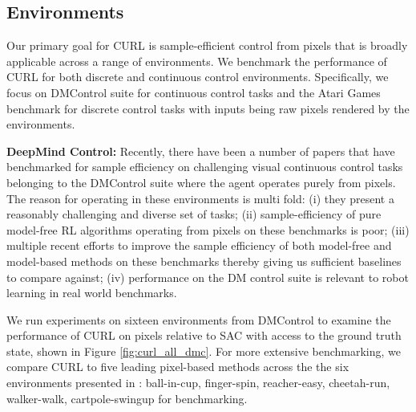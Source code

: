 \begin{table}[h!]
\begin{center}
\begin{small}
\begin{sc}
\begin{tabular}{lccccccc}
\bottomrule
\end{tabular}
\end{sc}
\end{small}
\end{center}
\vskip -0.1in
\end{table}


\subsection{Environments}

Our primary goal for CURL is sample-efficient control from pixels that is broadly applicable across a range of environments. We benchmark the performance of CURL for both discrete and continuous control environments. Specifically, we focus on DMControl suite for continuous control tasks and the Atari Games benchmark for discrete control tasks with inputs being raw pixels rendered by the environments.

\textbf{DeepMind Control:} Recently, there have been a number of papers that have benchmarked for sample efficiency on challenging visual continuous control tasks belonging to the DMControl suite \cite{tassa2018deepmind} where the agent operates purely from pixels. The reason for operating in these environments is multi fold: (i) they present a reasonably challenging and diverse set of tasks; (ii) sample-efficiency of pure model-free RL algorithms operating from pixels on these benchmarks is poor; (iii) multiple recent efforts to improve the sample efficiency of both model-free and model-based methods on these benchmarks thereby giving us sufficient baselines to compare against; (iv) performance on the DM control suite is relevant to robot learning in real world benchmarks.

We run experiments on sixteen environments from DMControl to examine the performance of CURL on pixels relative to SAC with access to the ground truth state, shown in Figure \ref{fig:curl_all_dmc}. For more extensive benchmarking, we compare CURL to five leading pixel-based methods across the the six environments presented in \citet{yarats2019improving}: ball-in-cup, finger-spin, reacher-easy, cheetah-run, walker-walk, cartpole-swingup for benchmarking. 

